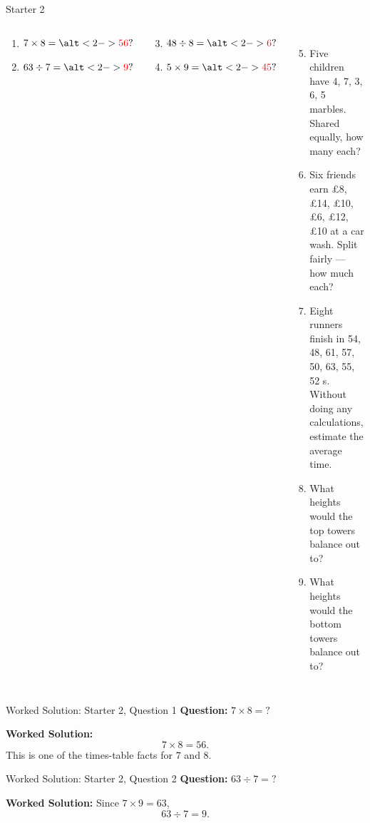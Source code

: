 \documentclass{beamer}
\newcommand{\ashow}[1]{\uncover<2->{\textcolor{red}{\small #1}}}
\newcommand{\ashowq}[1]{\alt<2->{\textcolor{red}{\small #1}}{?}}
\begin{document}
\begin{frame}{Starter 2}
\begin{columns}[T]
\footnotesize
\vspace{0.2em}
  \begin{multicols}{2}
  \begin{enumerate}
    \item $7 \times 8 = \ashowq{56}$
    \item $63 \div 7 = \ashowq{9}$
    \end{enumerate}
  \end{multicols}
  \begin{multicols}{2}
  \begin{enumerate}
  \setcounter{enumi}{2}
    \item $48 \div 8 = \ashowq{6}$
    \item $5 \times 9 = \ashowq{45}$
    \end{enumerate}
  \end{multicols}
  \begin{enumerate}
  \setcounter{enumi}{4}
  \item Five children have 4, 7, 3, 6, 5 marbles. Shared equally, how many each? \ashow{5 marbles}
  \item Six friends earn £8, £14, £10, £6, £12, £10 at a car wash. Split fairly — how much each? \ashow{\pounds10 each}
  \item Eight runners finish in 54, 48, 61, 57, 50, 63, 55, 52 s. Without doing any calculations, estimate the average time. \ashow{about 55 s}
  \item What heights would the top towers balance out to? \ashow{5 bricks high}
  \item What heights would the bottom towers balance out to? \ashow{4 bricks high}
\end{enumerate}

\end{columns}
\end{frame}

\begin{frame}{Worked Solution: Starter 2, Question 1}
\hypertarget{work-st2}{}
\textbf{Question:} \(7 \times 8 = ?\)

\textbf{Worked Solution:}
\[
7 \times 8 = 56.
\]
This is one of the times-table facts for \(7\) and \(8\).
\end{frame}

\begin{frame}{Worked Solution: Starter 2, Question 2}
\textbf{Question:} \(63 \div 7 = ?\)

\textbf{Worked Solution:}
Since \(7 \times 9 = 63\),
\[
63 \div 7 = 9.
\]
\end{frame}
\end{document}
